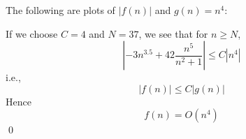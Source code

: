 The following are plots of $|f(n)|$ and $g(n) = n^4$:


If we choose $C = 4$ and $N = 37$,
we see that for $n \geq N$,
\[
\left|
-3n^{3.5} + 42 \frac{n^5}{n^2 + 1}
\right| 
\leq C
\left|
n^4
\right|
\]
i.e.,
\[
|f(n)| \leq C|g(n)|
\]
Hence
\[
f(n) = O(n^4)
\]
\qed
